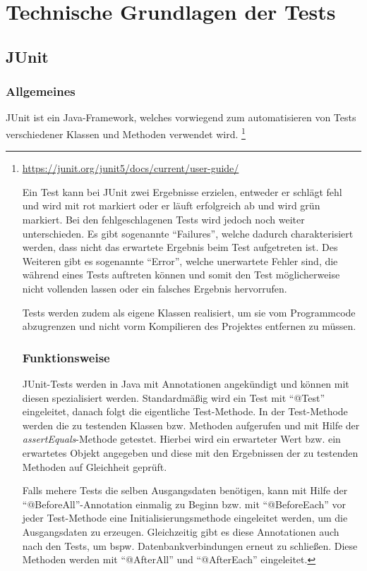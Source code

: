 \section{Technische Grundlagen der Tests}

\subsection{JUnit}

\subsubsection{Allgemeines}

JUnit ist ein Java-Framework, welches vorwiegend zum automatisieren von Tests verschiedener Klassen und Methoden verwendet wird. \footnote{\url{https://junit.org/junit5/docs/current/user-guide/}

Ein Test kann bei JUnit zwei Ergebnisse erzielen, entweder er schlägt fehl und wird mit rot markiert oder er läuft erfolgreich ab und wird grün markiert.
Bei den fehlgeschlagenen Tests wird jedoch noch weiter unterschieden. 
Es gibt sogenannte \enquote{Failures}, welche dadurch charakterisiert werden, dass nicht das erwartete Ergebnis beim Test aufgetreten ist.
Des Weiteren gibt es sogenannte \enquote{Error}, welche unerwartete Fehler sind, die während eines Tests auftreten können und somit den Test möglicherweise nicht vollenden lassen oder ein falsches Ergebnis hervorrufen.

Tests werden zudem als eigene Klassen realisiert, um sie vom Programmcode abzugrenzen und nicht vorm Kompilieren des Projektes entfernen zu müssen.

\subsubsection{Funktionsweise}

JUnit-Tests werden in Java mit Annotationen angekündigt und können mit diesen spezialisiert werden.
Standardmäßig wird ein Test mit \enquote{@Test} eingeleitet, danach folgt die eigentliche Test-Methode.
In der Test-Methode werden die zu testenden Klassen bzw. Methoden aufgerufen und mit Hilfe der \textit{assertEquals}-Methode getestet.
Hierbei wird ein erwarteter Wert bzw. ein erwartetes Objekt angegeben und diese mit den Ergebnissen der zu testenden Methoden auf Gleichheit geprüft.

Falls mehere Tests die selben Ausgangsdaten benötigen, kann mit Hilfe der \enquote{@BeforeAll}-Annotation einmalig zu Beginn bzw. mit \enquote{@BeforeEach} vor jeder Test-Methode eine Initialisierungsmethode eingeleitet werden, um die Ausgangsdaten zu erzeugen.
Gleichzeitig gibt es diese Annotationen auch nach den Tests, um bspw. Datenbankverbindungen erneut zu schließen. Diese Methoden werden mit \enquote{@AfterAll} und \enquote{@AfterEach} eingeleitet.

}
